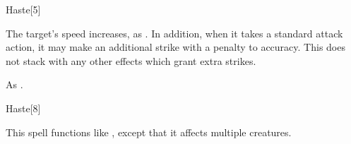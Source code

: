 \begin{spellsection}{Haste}[5]
    \begin{spellheader}
    \end{spellheader}
    \begin{spellcontent}
        \begin{spelltargetinginfo}
        \end{spelltargetinginfo}
        \begin{spelleffects}
            \spelleffect The target's speed increases, as . In addition, when it takes a standard attack action, it may make an additional strike with a  penalty to accuracy.
            This does not stack with any other effects which grant extra strikes.
            \spelldur \durshort
        \end{spelleffects}
    \end{spellcontent}
    \begin{spellfooter}
        \spellnotes As .
        \miscastrandom
    \end{spellfooter}
\end{spellsection}

\begin{spellsection}[Mass]{Haste}[8]
    \begin{spellheader}
    \end{spellheader}
    \begin{spellcontent}
        \begin{spelltargetinginfo}
        \end{spelltargetinginfo}
        \begin{spelleffects}
            \spellspecial This spell functions like , except that it affects multiple creatures.
        \end{spelleffects}
    \end{spellcontent}
    \begin{spellfooter}
        \miscastexplode
    \end{spellfooter}
\end{spellsection}

